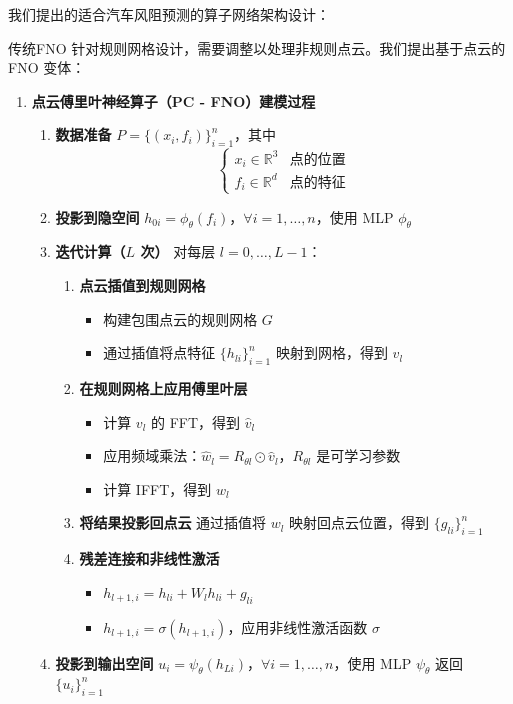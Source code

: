 \documentclass{MMCStyle}
\begin{document}
我们提出的适合汽车风阻预测的算子网络架构设计：  


传统FNO 针对规则网格设计，需要调整以处理非规则点云。我们提出基于点云的FNO 变体：



\begin{enumerate}
    \item \textbf{点云傅里叶神经算子（PC - FNO）建模过程}
    \begin{enumerate}
        \item \textbf{数据准备}
        \(P = \{(x_i, f_i)\}_{i = 1}^n\)，其中
        \[
        \begin{cases}
        x_i \in \mathbb{R}^3 & \text{点的位置}\\
        f_i \in \mathbb{R}^d & \text{点的特征}
        \end{cases}
        \]
        \item \textbf{投影到隐空间}
        \(h_{0i} = \phi_{\theta}(f_i)\)，\(\forall i = 1, \ldots, n\)，使用 MLP \(\phi_{\theta}\)
        \item \textbf{迭代计算（\(L\) 次）}
        对每层 \(l = 0, \ldots, L - 1\)：
        \begin{enumerate}
            \item \textbf{点云插值到规则网格}
            \begin{itemize}
                \item 构建包围点云的规则网格 \(G\)
                \item 通过插值将点特征 \(\{h_{li}\}_{i = 1}^n\) 映射到网格，得到 \(v_l\)
            \end{itemize}
            \item \textbf{在规则网格上应用傅里叶层}
            \begin{itemize}
                \item 计算 \(v_l\) 的 FFT，得到 \(\hat{v}_l\)
                \item 应用频域乘法：\(\hat{w}_l = R_{\theta l} \odot \hat{v}_l\)，\(R_{\theta l}\) 是可学习参数
                \item 计算 IFFT，得到 \(w_l\)
            \end{itemize}
            \item \textbf{将结果投影回点云}
            通过插值将 \(w_l\) 映射回点云位置，得到 \(\{g_{li}\}_{i = 1}^n\)
            \item \textbf{残差连接和非线性激活}
            \begin{itemize}
                \item \(h_{l + 1, i} = h_{li} + W_l h_{li} + g_{li}\)
                \item \(h_{l + 1, i} = \sigma(h_{l + 1, i})\)，应用非线性激活函数 \(\sigma\)
            \end{itemize}
        \end{enumerate}
        \item \textbf{投影到输出空间}
        \(u_i = \psi_{\theta}(h_{Li})\)，\(\forall i = 1, \ldots, n\)，使用 MLP \(\psi_{\theta}\)
        返回 \(\{u_i\}_{i = 1}^n\)
    \end{enumerate}








\end{enumerate}
\end{document}
